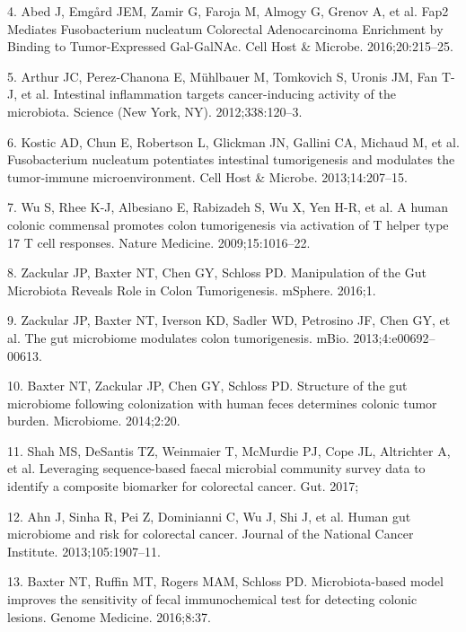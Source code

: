 \documentclass[12pt,]{article}
\begin{document}
\hypertarget{ref-abed_fap2_2016}{}
4. Abed J, Emgård JEM, Zamir G, Faroja M, Almogy G, Grenov A, et al.
Fap2 Mediates Fusobacterium nucleatum Colorectal Adenocarcinoma
Enrichment by Binding to Tumor-Expressed Gal-GalNAc. Cell Host \&
Microbe. 2016;20:215--25.

\hypertarget{ref-arthur_intestinal_2012}{}
5. Arthur JC, Perez-Chanona E, Mühlbauer M, Tomkovich S, Uronis JM, Fan
T-J, et al. Intestinal inflammation targets cancer-inducing activity of
the microbiota. Science (New York, NY). 2012;338:120--3.

\hypertarget{ref-kostic_fusobacterium_2013}{}
6. Kostic AD, Chun E, Robertson L, Glickman JN, Gallini CA, Michaud M,
et al. Fusobacterium nucleatum potentiates intestinal tumorigenesis and
modulates the tumor-immune microenvironment. Cell Host \& Microbe.
2013;14:207--15.

\hypertarget{ref-wu_human_2009}{}
7. Wu S, Rhee K-J, Albesiano E, Rabizadeh S, Wu X, Yen H-R, et al. A
human colonic commensal promotes colon tumorigenesis via activation of T
helper type 17 T cell responses. Nature Medicine. 2009;15:1016--22.

\hypertarget{ref-zackular_manipulation_2016}{}
8. Zackular JP, Baxter NT, Chen GY, Schloss PD. Manipulation of the Gut
Microbiota Reveals Role in Colon Tumorigenesis. mSphere. 2016;1.

\hypertarget{ref-zackular_gut_2013}{}
9. Zackular JP, Baxter NT, Iverson KD, Sadler WD, Petrosino JF, Chen GY,
et al. The gut microbiome modulates colon tumorigenesis. mBio.
2013;4:e00692--00613.

\hypertarget{ref-baxter_structure_2014}{}
10. Baxter NT, Zackular JP, Chen GY, Schloss PD. Structure of the gut
microbiome following colonization with human feces determines colonic
tumor burden. Microbiome. 2014;2:20.

\hypertarget{ref-shah_leveraging_2017}{}
11. Shah MS, DeSantis TZ, Weinmaier T, McMurdie PJ, Cope JL, Altrichter
A, et al. Leveraging sequence-based faecal microbial community survey
data to identify a composite biomarker for colorectal cancer. Gut. 2017;

\hypertarget{ref-ahn_human_2013}{}
12. Ahn J, Sinha R, Pei Z, Dominianni C, Wu J, Shi J, et al. Human gut
microbiome and risk for colorectal cancer. Journal of the National
Cancer Institute. 2013;105:1907--11.

\hypertarget{ref-baxter_microbiota-based_2016}{}
13. Baxter NT, Ruffin MT, Rogers MAM, Schloss PD. Microbiota-based model
improves the sensitivity of fecal immunochemical test for detecting
colonic lesions. Genome Medicine. 2016;8:37.
\end{document}
